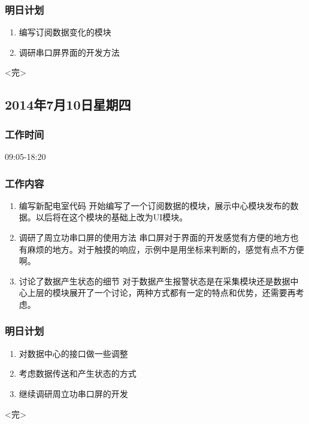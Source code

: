 \documentclass[11pt]{article}
\begin{document}
\subsubsection{明日计划}
  \begin{enumerate}
  \item 编写订阅数据变化的模块
  \item 调研串口屏界面的开发方法
  \end{enumerate}

\centerline{<完>}

\newpage
\subsection{2014年7月10日星期四}

\subsubsection{工作时间}

  09:05-18:20
\subsubsection{工作内容}
  \begin{enumerate}
  \item 编写新配电室代码\newline
    开始编写了一个订阅数据的模块，展示中心模块发布的数据。以后将在这个模块的基础上改为UI模块。
  \item 调研了周立功串口屏的使用方法\newline
    串口屏对于界面的开发感觉有方便的地方也有麻烦的地方。对于触摸的响应，示例中是用坐标来判断的，感觉有点不方便啊。
  \item 讨论了数据产生状态的细节\newline
    对于数据产生报警状态是在采集模块还是数据中心上层的模块展开了一个讨论，两种方式都有一定的特点和优势，还需要再考虑。
    \end{enumerate}
\subsubsection{明日计划}
  \begin{enumerate}
  \item 对数据中心的接口做一些调整
  \item 考虑数据传送和产生状态的方式
  \item 继续调研周立功串口屏的开发
  \end{enumerate}

\centerline{<完>}
\end{document}
